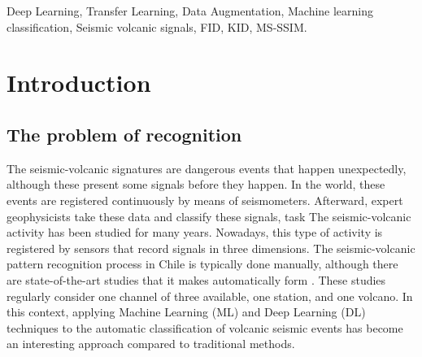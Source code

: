 \documentclass[journal]{IEEEtran}
\begin{document}
\begin{IEEEkeywords}
Deep Learning, Transfer Learning, Data Augmentation, Machine learning classification, Seismic volcanic signals, FID, KID, MS-SSIM.
\end{IEEEkeywords}






%
\IEEEpeerreviewmaketitle



\section{Introduction}
%
%
%
%

\subsection{The problem of recognition}
The seismic-volcanic signatures are dangerous events that happen unexpectedly, although these present some signals before they happen. In the world, these events are registered continuously by means of seismometers. Afterward, expert geophysicists take these data and classify these signals, task
The seismic-volcanic activity has been studied for many years. Nowadays, this type of activity is registered by sensors that record signals in three dimensions. The seismic-volcanic pattern recognition process in Chile is typically done manually, although there are state-of-the-art studies that it makes automatically form \cite{salazar2022multi,salazar2020deep,malfante2018automatic,bicego2012classification,curilem2016pattern, lara2020automatic}. These studies regularly consider one channel of three available, one station, and one volcano.
In this context, applying Machine Learning (ML) and Deep Learning (DL) techniques to the automatic classification of volcanic seismic events has become an interesting approach compared to traditional methods.
\end{document}
